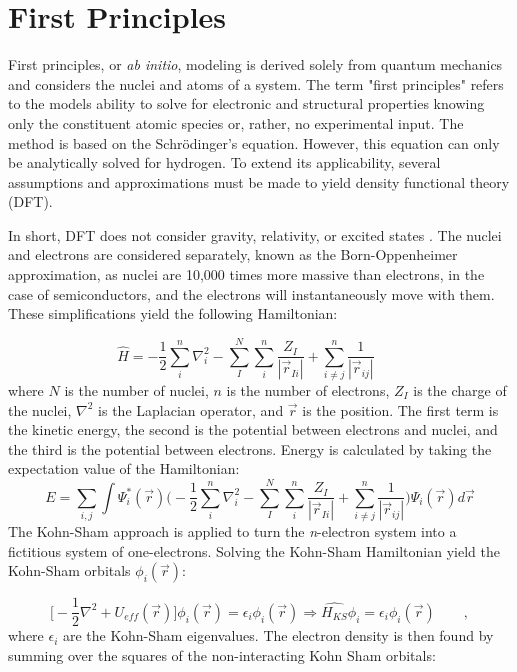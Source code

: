 \documentclass[3p,review,12pt]{elsarticle}
\begin{document}
\section{First Principles}
First principles, or \emph{ab initio}, modeling is derived solely from quantum mechanics and considers the nuclei and atoms of a system. The term "first principles" refers to the models ability to solve for electronic and structural properties knowing only the constituent atomic species or, rather, no experimental input. The method is based on the Schr\"odinger's equation. However, this equation can only be analytically solved for hydrogen. To extend its applicability, several assumptions and approximations must be made to yield density functional theory (DFT).
\par 
In short, DFT does not consider gravity, relativity, or excited states \cite{Lee2012}. The nuclei and electrons are considered separately, known as the Born-Oppenheimer approximation, as nuclei are 10,000 times more massive than electrons, in the case of semiconductors, and the electrons will instantaneously move with them.  These simplifications yield the following Hamiltonian:

\begin{equation}
\hat{H}=-\frac{1}{2}\sum_{i}^{n}\nabla_{i}^{2}-\sum_{I}^{N}\sum_{i}^{n}\frac{Z_{I}}{|\vec{r}_{Ii}|}+\sum_{i\neq j}^{n}\frac{1}{|\vec{r}_{ij}|} \qquad 
\end{equation}
where $N$ is the number of nuclei, $n$ is the number of electrons, $Z_{I}$ is the charge of the nuclei, $\nabla^{2}$ is the Laplacian operator, and $\vec{r}$ is the position. The first term is the kinetic energy, the second is the potential between electrons and nuclei, and the third is the potential between electrons. Energy is calculated by taking the expectation value of the Hamiltonian:
\begin{equation}
	E = \sum_{i,j} \int \Psi_{i}^{*} (\vec{r}) \Bigg(-\frac{1}{2}\sum_{i}^{n}\nabla_{i}^{2}-\sum_{I}^{N}\sum_{i}^{n}\frac{Z_{I}}{|\vec{r}_{Ii}|}+\sum_{i\neq j}^{n}\frac{1}{|\vec{r}_{ij}|}\Bigg)\Psi_{i}(\vec{r})d\vec{r}
\end{equation}
 The Kohn-Sham approach is applied to turn the \emph{n}-electron system into a fictitious system of one-electrons. Solving the Kohn-Sham Hamiltonian yield the Kohn-Sham orbitals $\phi_{i}(\vec{r})$:
 
 \begin{equation}
 \bigg[-\frac{1}{2}\nabla^{2}+U_{eff}(\vec{r})\bigg]\phi_{i}(\vec{r}) = \epsilon_{i}\phi_{i}(\vec{r}) \Rightarrow \hat{H_{KS}}\phi_{i} = \epsilon_{i}\phi_{i}(\vec{r}) \qquad ,
 \end{equation}
where $\epsilon_{i}$ are the Kohn-Sham eigenvalues. The electron density is then found by summing over the squares of the non-interacting Kohn Sham orbitals:
\end{document}
